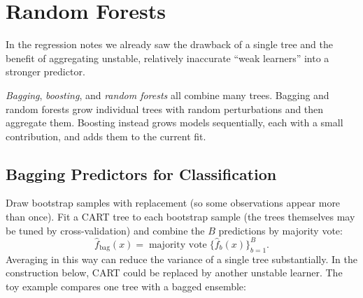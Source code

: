 \documentclass[
]{book}
\begin{document}
\vspace{1.2em}

\section{Random Forests}\label{random-forests-1}

In the regression notes we already saw the drawback of a single tree and the benefit of aggregating unstable, relatively inaccurate ``weak learners'' into a stronger predictor.

\emph{Bagging}, \emph{boosting}, and \emph{random forests} all combine many trees. Bagging and random forests grow individual trees with random perturbations and then aggregate them. Boosting instead grows models sequentially, each with a small contribution, and adds them to the current fit.

\subsection{Bagging Predictors for Classification}\label{bagging-predictors-for-classification}

Draw bootstrap samples with replacement (so some observations appear more than once). Fit a CART tree to each bootstrap sample (the trees themselves may be tuned by cross-validation) and combine the \(B\) predictions by majority vote:
\[
\hat{f}_{\operatorname{bag}}(x)
=
\operatorname{majority\ vote}\bigl\{\hat{f}_b(x)\bigr\}_{b=1}^{B}.
\]
Averaging in this way can reduce the variance of a single tree substantially. In the construction below, CART could be replaced by another unstable learner. The toy example compares one tree with a bagged ensemble:
\end{document}
